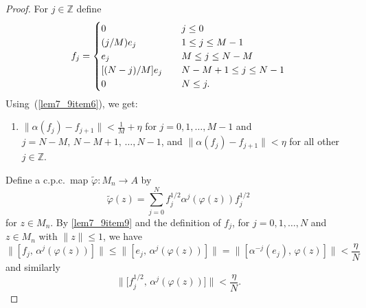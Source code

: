 \documentclass[11pt]{amsart}
\theoremstyle{plain}
\theoremstyle{definition}
\theoremstyle{remark}
\numberwithin{equation}{section}
\newcounter{TmpEnumi}
\newcommand{\af}{\alpha}
\newcommand{\et}{\eta}
\newcommand{\ph}{\varphi}
\begin{document}
\begin{proof}
For $j \in {\mathbb{Z}}$ define
\begin{equation*}
f_{j} =
\begin{cases}
0
& \hspace*{1em} j \leq 0
\\
(j / M) e_{j}
& \hspace*{1em} 1 \leq j \leq M - 1
\\
e_{j}
& \hspace*{1em} M \leq j \leq N - M
\\
[ (N - j) / M] e_{j}
& \hspace*{1em} N - M  + 1 \leq j \leq N - 1
\\
0
& \hspace*{1em} N \leq j.
\end{cases}
\end{equation*}
Using~(\ref{lem7_9item6}),
we get:
%
\begin{enumerate}
\setcounter{enumi}{\value{TmpEnumi}}
\item\label{lem7_9item11n}
$\| \af (f_j) - f_{j + 1} \| < \frac{1}{M} + \et$
for $j = 0, 1, \ldots, M - 1$
and $j = N - M, \, N - M + 1, \, \ldots, N - 1$,
and
$\| \af (f_j) - f_{j + 1} \| < \et$
for all other $j \in {\mathbb{Z}}$.
\setcounter{TmpEnumi}{\value{enumi}}
\end{enumerate}
%
Define a c.p.c.~map $\widetilde{\varphi} \colon M_{n} \to A$ by
\[
\widetilde{\varphi} (z)
 = \sum_{j = 0}^{N} f_{j}^{1/2} \alpha^{j} (\varphi (z)) f_{j}^{1/2}
\]
for $z \in M_n$.
By \eqref{lem7_9item9} and the definition of $f_j$,
for $j = 0, 1, \ldots, N$
and $z \in M_{n}$ with $\| z \| \leq 1$,
we have
%
\begin{equation}\label{Eq_8615_CommFull}
\| [ f_j, \, \af^j ( \ph (z)) ] \|
  \leq \| [ e_j, \, \af^j ( \ph (z)) ] \|
  = \| [ \af^{- j} ( e_j), \, \ph (z) ] \|
  < \frac{\et}{N}
\end{equation}
%
and similarly
%
\begin{equation}\label{Eq_8615_CommHalf}
\big\| \big[ f_j^{1/2}, \, \af^j ( \ph (z)) \big] \big\|
  < \frac{\et}{N}.

\end{equation}
\end{proof}
\end{document}
